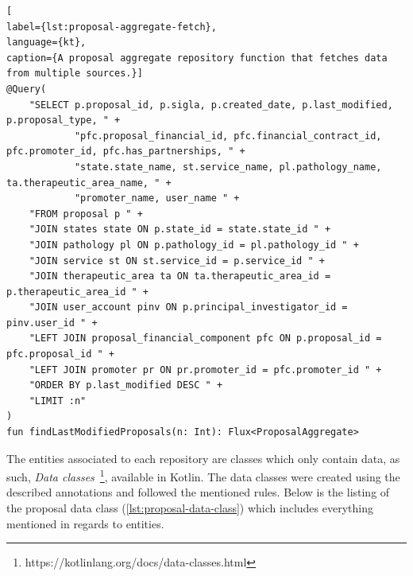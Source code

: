 \begin{lstlisting}[
label={lst:proposal-aggregate-fetch},
language={kt},
caption={A proposal aggregate repository function that fetches data from multiple sources.}]
@Query(
    "SELECT p.proposal_id, p.sigla, p.created_date, p.last_modified, p.proposal_type, " +
            "pfc.proposal_financial_id, pfc.financial_contract_id, pfc.promoter_id, pfc.has_partnerships, " +
            "state.state_name, st.service_name, pl.pathology_name, ta.therapeutic_area_name, " +
            "promoter_name, user_name " +
    "FROM proposal p " +
    "JOIN states state ON p.state_id = state.state_id " +
    "JOIN pathology pl ON p.pathology_id = pl.pathology_id " +
    "JOIN service st ON st.service_id = p.service_id " +
    "JOIN therapeutic_area ta ON ta.therapeutic_area_id = p.therapeutic_area_id " +
    "JOIN user_account pinv ON p.principal_investigator_id = pinv.user_id " +
    "LEFT JOIN proposal_financial_component pfc ON p.proposal_id = pfc.proposal_id " +
    "LEFT JOIN promoter pr ON pr.promoter_id = pfc.promoter_id " +
    "ORDER BY p.last_modified DESC " +
    "LIMIT :n"
)
fun findLastModifiedProposals(n: Int): Flux<ProposalAggregate>
\end{lstlisting}

The entities associated to each repository are classes which only contain data, as such, \textit{Data classes}~\footnote{https://kotlinlang.org/docs/data-classes.html}\label{fn:kotlin-data-classes}, available in Kotlin. 
The data classes were created using the described annotations and followed the mentioned rules. Below is the listing of the proposal data class (\ref{lst:proposal-data-class}) which includes everything mentioned in regards to entities.

